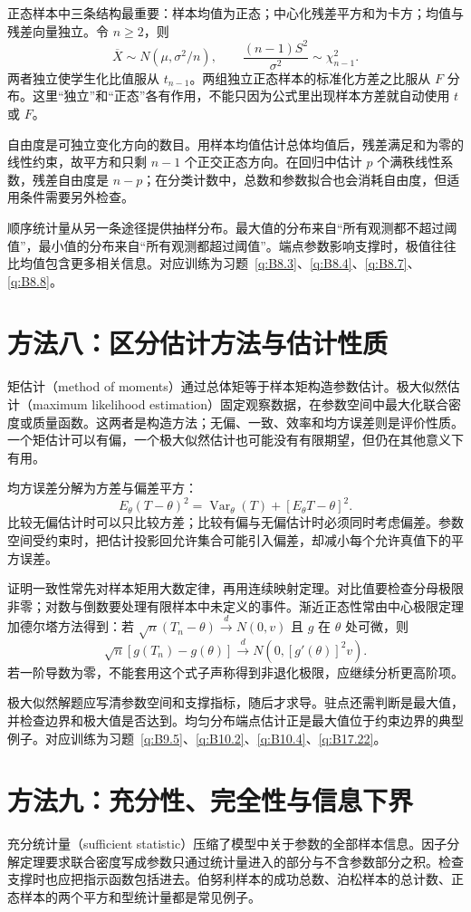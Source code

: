 \documentclass[UTF8,12pt,a4paper,fontset=fandol]{ctexart}
\begin{document}
正态样本中三条结构最重要：样本均值为正态；中心化残差平方和为卡方；均值与残差向量独立。令 $n\ge2$，则
\[
\overline X\sim N(\mu,\sigma^2/n),\qquad\frac{(n-1)S^2}{\sigma^2}\sim\chi^2_{n-1}.
\]
两者独立使学生化比值服从 $t_{n-1}$。两组独立正态样本的标准化方差之比服从 $F$ 分布。这里“独立”和“正态”各有作用，不能只因为公式里出现样本方差就自动使用 $t$ 或 $F$。

自由度是可独立变化方向的数目。用样本均值估计总体均值后，残差满足和为零的线性约束，故平方和只剩 $n-1$ 个正交正态方向。在回归中估计 $p$ 个满秩线性系数，残差自由度是 $n-p$；在分类计数中，总数和参数拟合也会消耗自由度，但适用条件需要另外检查。

顺序统计量从另一条途径提供抽样分布。最大值的分布来自“所有观测都不超过阈值”，最小值的分布来自“所有观测都超过阈值”。端点参数影响支撑时，极值往往比均值包含更多相关信息。对应训练为习题~\ref{q:B8.3}、\ref{q:B8.4}、\ref{q:B8.7}、\ref{q:B8.8}。

\section*{方法八：区分估计方法与估计性质}
矩估计（method of moments）通过总体矩等于样本矩构造参数估计。极大似然估计（maximum likelihood estimation）固定观察数据，在参数空间中最大化联合密度或质量函数。这两者是构造方法；无偏、一致、效率和均方误差则是评价性质。一个矩估计可以有偏，一个极大似然估计也可能没有有限期望，但仍在其他意义下有用。

均方误差分解为方差与偏差平方：
\[
E_\theta(T-\theta)^2=\operatorname{Var}_\theta(T)+[E_\theta T-\theta]^2.
\]
比较无偏估计时可以只比较方差；比较有偏与无偏估计时必须同时考虑偏差。参数空间受约束时，把估计投影回允许集合可能引入偏差，却减小每个允许真值下的平方误差。

证明一致性常先对样本矩用大数定律，再用连续映射定理。对比值要检查分母极限非零；对数与倒数要处理有限样本中未定义的事件。渐近正态性常由中心极限定理加德尔塔方法得到：若 $\sqrt n(T_n-\theta)\xrightarrow dN(0,v)$ 且 $g$ 在 $\theta$ 处可微，则
\[
\sqrt n[g(T_n)-g(\theta)]\xrightarrow dN(0,[g'(\theta)]^2v).
\]
若一阶导数为零，不能套用这个式子声称得到非退化极限，应继续分析更高阶项。

极大似然解题应写清参数空间和支撑指标，随后才求导。驻点还需判断是最大值，并检查边界和极大值是否达到。均匀分布端点估计正是最大值位于约束边界的典型例子。对应训练为习题~\ref{q:B9.5}、\ref{q:B10.2}、\ref{q:B10.4}、\ref{q:B17.22}。

\section*{方法九：充分性、完全性与信息下界}
充分统计量（sufficient statistic）压缩了模型中关于参数的全部样本信息。因子分解定理要求联合密度写成参数只通过统计量进入的部分与不含参数部分之积。检查支撑时也应把指示函数包括进去。伯努利样本的成功总数、泊松样本的总计数、正态样本的两个平方和型统计量都是常见例子。
\end{document}
